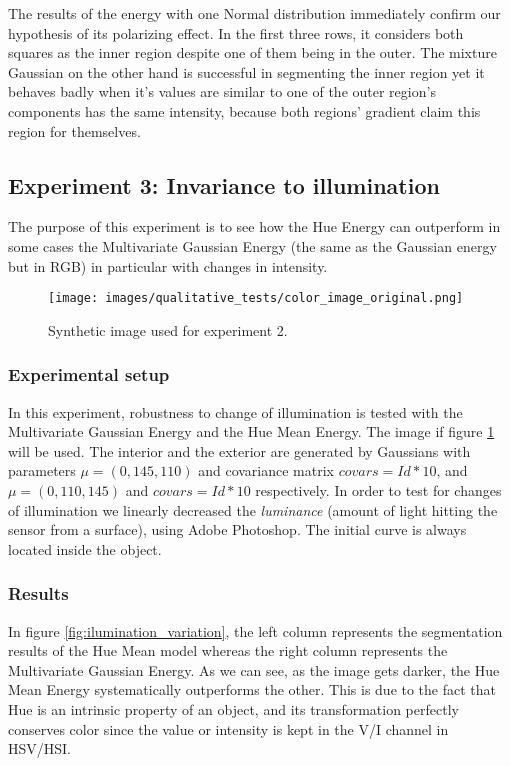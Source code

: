 The results of the energy with one Normal distribution immediately confirm our hypothesis of its polarizing effect. In the first three rows, it considers both squares as the inner region despite one of them being in the outer. The mixture Gaussian on the other hand is successful in segmenting the inner region yet it behaves badly when it's values are similar to one of the outer region's components has the same intensity, because both regions' gradient claim this region for themselves.


\subsection{Experiment 3: Invariance to illumination}
\label{subsubsec:experiment3}

The purpose of this experiment is to see how the Hue Energy can outperform in some cases the Multivariate Gaussian Energy (the same as the Gaussian energy but in RGB) in particular with changes in intensity.
\begin{figure}[H]
	\centering
	{\texttt{[image: images/qualitative\_tests/color\_image\_original.png]}}
	\caption{Synthetic image used for experiment 2.}
	\label{fig:synthetic_experiment3}
\end{figure}

\subsubsection{Experimental setup}
In this experiment, robustness to change of illumination is tested with the Multivariate Gaussian Energy and the Hue Mean Energy. The image if figure \ref{fig:synthetic_experiment3} will be used. The interior and the exterior are generated by Gaussians with parameters $\mu=(0,145,110)$ and covariance matrix $covars=Id*10$, and  $\mu=(0,110,145)$ and $covars=Id*10$ respectively. In order to test for changes of illumination we  linearly decreased the \textit{luminance} (amount of light hitting the sensor from a surface)\cite{conf/cvpr/Yu09},  using Adobe Photoshop. The initial curve is always located inside the object.

\subsubsection{Results}
In figure \ref{fig:ilumination_variation}, the left column represents the segmentation results of the Hue Mean model whereas the right column represents the Multivariate Gaussian Energy. As we can see, as the image gets darker, the Hue Mean Energy systematically outperforms the other. This is due to the fact that Hue is an intrinsic property of an object, and its transformation perfectly conserves color since the value or intensity is kept in the V/I channel in HSV/HSI.

